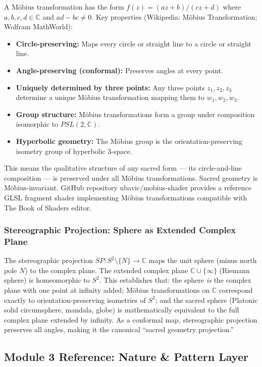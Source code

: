 \documentclass[11pt,letterpaper]{article}
\begin{document}
A M\"{o}bius transformation has the form $f(z) = (az+b)/(cz+d)$ where $a,b,c,d \in \mathbb{C}$ and $ad-bc \neq 0$. Key properties (Wikipedia: M\"{o}bius Transformation; Wolfram MathWorld):
\begin{itemize}[leftmargin=1.5em]
  \item \textbf{Circle-preserving:} Maps every circle or straight line to a circle or straight line.
  \item \textbf{Angle-preserving (conformal):} Preserves angles at every point.
  \item \textbf{Uniquely determined by three points:} Any three points $z_1, z_2, z_3$ determine a unique M\"{o}bius transformation mapping them to $w_1, w_2, w_3$.
  \item \textbf{Group structure:} M\"{o}bius transformations form a group under composition isomorphic to $PSL(2, \mathbb{C})$.
  \item \textbf{Hyperbolic geometry:} The M\"{o}bius group is the orientation-preserving isometry group of hyperbolic 3-space.
\end{itemize}

This means the qualitative structure of any sacred form --- its circle-and-line composition --- is preserved under all M\"{o}bius transformations. Sacred geometry is M\"{o}bius-invariant. GitHub repository ubavic/mobius-shader provides a reference GLSL fragment shader implementing M\"{o}bius transformations compatible with The Book of Shaders editor.

\subsubsection{Stereographic Projection: Sphere as Extended Complex Plane}

The stereographic projection $SP: S^2 \setminus \{N\} \to \mathbb{C}$ maps the unit sphere (minus north pole $N$) to the complex plane. The extended complex plane $\mathbb{C} \cup \{\infty\}$ (Riemann sphere) is homeomorphic to $S^2$. This establishes that: the sphere \textit{is} the complex plane with one point at infinity added; M\"{o}bius transformations on $\mathbb{C}$ correspond exactly to orientation-preserving isometries of $S^2$; and the sacred sphere (Platonic solid circumsphere, mandala, globe) is mathematically equivalent to the full complex plane extended by infinity. As a conformal map, stereographic projection preserves all angles, making it the canonical ``sacred geometry projection.''

\subsection{Module 3 Reference: Nature \& Pattern Layer}
\end{document}
